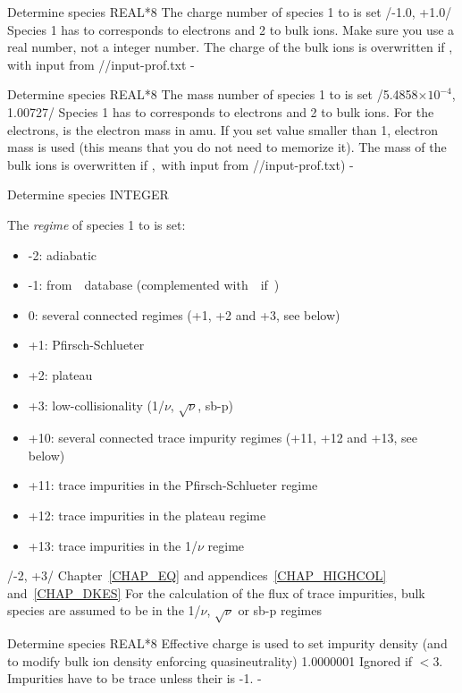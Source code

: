 {Determine species}
{REAL*8}
{The charge number of species 1 to  is set}
{/-1.0, +1.0/}%
{Species 1 has to corresponds to electrons and 2 to bulk ions. Make sure you use a real number, not a integer number. The charge of the bulk ions is overwritten if , with input from {\ttfamily //input-prof.txt}}
{-}

{Determine species}
{REAL*8}
{The mass number of species 1 to  is set}
{/5.4858$\times 10^{-4}$, 1.00727/}%
{Species 1 has to corresponds to electrons and 2 to bulk ions. For the electrons,  is the electron mass in amu. If you set  value smaller than 1, electron mass is used (this means that you do not need to memorize it). The mass of the bulk ions is overwritten if ,~with input from {\ttfamily //input-prof.txt})}
{-}

{Determine species}
{INTEGER}
{The \textit{regime} of species 1 to  is set:
\begin{itemize}
\item  -2: adiabatic
\item  -1: from~\DKES~database (complemented with~\KNOSOS~if~)
\item   0: several connected regimes (+1, +2 and +3, see below)
\item  +1: Pfirsch-Schlueter
\item  +2: plateau
\item  +3: low-collisionality (1/$\nu$, $\sqrt{\nu}$, sb-p)
\item +10: several connected trace impurity regimes (+11, +12 and +13, see below)
\item +11: trace impurities in the Pfirsch-Schlueter regime
\item +12: trace impurities in the plateau regime
\item +13: trace impurities in the 1/$\nu$ regime
\end{itemize}}
{/-2, +3/}
{Chapter~\ref{CHAP_EQ} and appendices~\ref{CHAP_HIGHCOL} and~\ref{CHAP_DKES}} 
{For the calculation of the flux of  trace impurities, bulk species are assumed to be in the 1/$\nu$, $\sqrt{\nu}$ or sb-p regimes}

{Determine species}
{REAL*8}
{Effective charge  is used to set impurity density (and to modify bulk ion density enforcing quasineutrality)}
{1.0000001}
{Ignored if $<$3. Impurities have to be trace unless their  is -1.}
{-}

